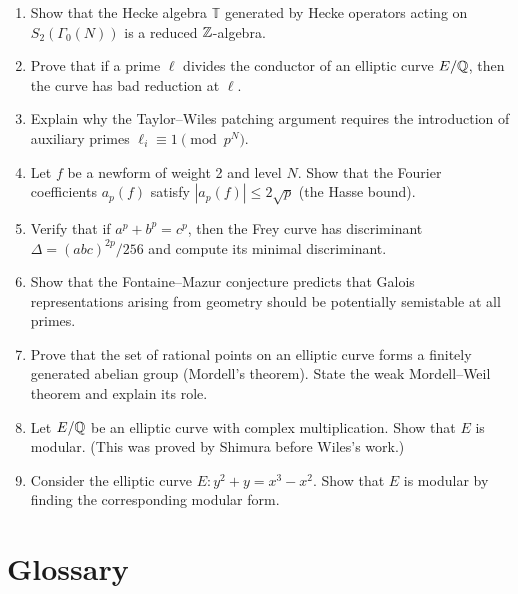 \begin{enumerate}
    \item [I] Show that the Hecke algebra \(\mathbb{T}\) generated by Hecke operators acting on \(S_2(\Gamma_0(N))\) is a reduced \(\mathbb{Z}\)-algebra.
    \item [B] Prove that if a prime \(\ell\) divides the conductor of an elliptic curve \(E/\mathbb{Q}\), then the curve has bad reduction at \(\ell\).
    \item [I] Explain why the Taylor--Wiles patching argument requires the introduction of auxiliary primes \(\ell_i \equiv 1 \pmod{p^N}\).
    \item [B] Let \(f\) be a newform of weight 2 and level \(N\). Show that the Fourier coefficients \(a_p(f)\) satisfy \(|a_p(f)| \leq 2\sqrt{p}\) (the Hasse bound).
    \item [I] Verify that if \(a^p + b^p = c^p\), then the Frey curve has discriminant \(\Delta = (abc)^{2p}/256\) and compute its minimal discriminant.
    \item [I] Show that the Fontaine--Mazur conjecture predicts that Galois representations arising from geometry should be potentially semistable at all primes.
    \item [I] Prove that the set of rational points on an elliptic curve forms a finitely generated abelian group (Mordell's theorem). State the weak Mordell--Weil theorem and explain its role.
    \item [I] Let \(E/\mathbb{Q}\) be an elliptic curve with complex multiplication. Show that \(E\) is modular. (This was proved by Shimura before Wiles's work.)
    \item [I] Consider the elliptic curve \(E: y^2 + y = x^3 - x^2\). Show that \(E\) is modular by finding the corresponding modular form.
\end{enumerate}

\section*{Glossary}

